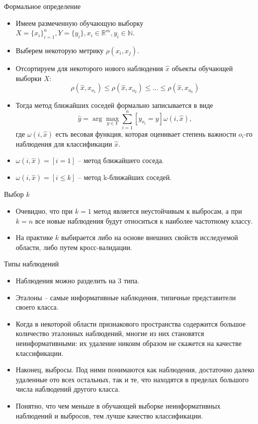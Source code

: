\documentclass{beamer}
\begin{document}
\begin{frame}{Формальное определение}
    \small
    \begin{itemize}
         \item Имеем размеченную обучающую выборку $X = \{ x_i\}_{i=1}^n, Y = \{ y_i \}, x_i \in \mathbb{R}^m, y_i \in \mathbb{N}$.
         \item Выберем некоторую метрику $\rho(x_i, x_j)$.
         \item Отсортируем для некоторого нового наблюдения $\widehat x$ объекты обучающей выборки $X$:
         $$\rho(\widehat x, x_{o_1}) \leqslant \rho(\widehat x, x_{o_2}) \leqslant \ldots \leqslant \rho(\widehat x, x_{o_n})$$
         \item Тогда метод ближайших соседей формально записывается в виде
         $$\widehat y = \arg \max_{y \in Y} \sum_{i=1}^n \left [ y_{o_i} = y \right ] \omega(i, \widehat x),$$
         где $\omega(i, \widehat x)$ есть весовая функция, которая оценивает степень важности $o_i$-го наблюдения для классификации $\widehat x$.
        \item $\omega(i, \widehat x) = [ i = 1 ]$ -- метод ближайшего соседа.
        \item $\omega(i, \widehat x) = [ i \leqslant k ]$ -- метод k-ближайших соседей.
    \end{itemize}
\end{frame}

\begin{frame}{Выбор $k$}
    \begin{itemize}
        \item Очевидно, что при $k = 1$ метод является неустойчивым к выбросам, а при $k = n$ все новые наблюдения будут относиться к наиболее частотному классу.
        \item На практике $k$ выбирается либо на основе внешних свойств исследуемой области, либо путем кросс-валидации.
    \end{itemize}
\end{frame}

\begin{frame}{Типы наблюдений}
    \small
    \begin{itemize}
        \item Наблюдения можно разделить на 3 типа.
        \item Эталоны -- самые информативные наблюдения, типичные представители своего класса. 
        \item Когда в некоторой области признакового пространства содержится большое количество эталонных наблюдений, многие из них становятся неинформативными: их удаление никоим образом не скажется на качестве классификации.
        \item Наконец, выбросы. Под ними понимаются как наблюдения, достаточно далеко удаленные ото всех остальных, так и те, что находятся в пределах большого числа наблюдений другого класса.
        \item Понятно, что чем меньше в обучающей выборке неинформативных наблюдений и выбросов, тем лучше качество классификации.
    \end{itemize}
\end{frame}
\end{document}
